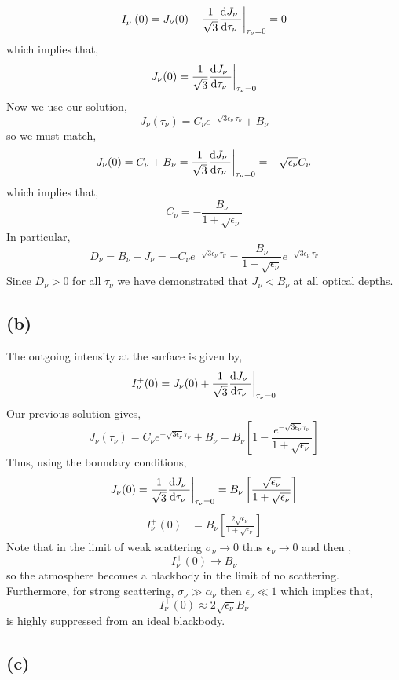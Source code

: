 \documentclass[12pt]{article}
\begin{document}
\[ I^{-}_\nu(0) = J_\nu(0) - \frac{1}{\sqrt{3}} \frac{\mathrm{d} J_\nu \;}{\mathrm{d} \tau_\nu \;} \bigg|_{\tau_\nu = 0} = 0 \]
which implies that,
\[ J_\nu(0) = \frac{1}{\sqrt{3}} \frac{\mathrm{d} J_\nu \;}{\mathrm{d} \tau_\nu \;} \bigg|_{\tau_\nu = 0} \]
Now we use our solution,
\[ J_\nu(\tau_\nu) = C_\nu e^{-\sqrt{3 \epsilon_\nu} \tau_\nu} + B_\nu \]
so we must match,
\[ J_\nu(0) = C_\nu + B_\nu = \frac{1}{\sqrt{3}}  \frac{\mathrm{d} J_\nu \;}{\mathrm{d} \tau_\nu \;} \bigg|_{\tau_\nu = 0} = - \sqrt{\epsilon_\nu} C_\nu \]
which implies that,
\[ C_\nu = - \frac{B_\nu}{1 + \sqrt{\epsilon_\nu}} \]
In particular,
\[ D_\nu = B_\nu - J_\nu = - C_\nu e^{-\sqrt{3 \epsilon_\nu} \tau_\nu} = \frac{B_\nu}{1 + \sqrt{\epsilon_\nu}} e^{-\sqrt{3 \epsilon_\nu} \tau_\nu} \]
Since $D_\nu > 0$ for all $\tau_\nu$ we have demonstrated that $J_\nu < B_\nu$ at all optical depths.

\subsection*{(b)}

The outgoing intensity at the surface is given by,
\[ I^{+}_\nu(0) = J_\nu(0) + \frac{1}{\sqrt{3}} \frac{\mathrm{d} J_\nu \;}{\mathrm{d} \tau_\nu \;} \bigg|_{\tau_\nu = 0} \]
Our previous solution gives,
\[ J_\nu(\tau_\nu) = C_\nu e^{-\sqrt{3 \epsilon_\nu} \tau_\nu} + B_\nu = B_\nu \left[ 1 - \frac{e^{-\sqrt{3 \epsilon_\nu} \tau_\nu}}{1 + \sqrt{\epsilon_\nu}} \right]  \]
Thus, using the boundary conditions,
\[ J_\nu(0)= \frac{1}{\sqrt{3}} \frac{\mathrm{d} J_\nu \;}{\mathrm{d} \tau_\nu \;} \bigg|_{\tau_\nu = 0} = B_\nu \left[ \frac{\sqrt{\epsilon_\nu}}{1 + \sqrt{\epsilon_\nu}} \right] \]
\begin{align*}
I^{+}_\nu(0) & = B_\nu \left[ \frac{2 \sqrt{\epsilon_\nu}}{1 + \sqrt{\epsilon_\nu}} \right]
\end{align*}
Note that in the limit of weak scattering $\sigma_\nu \to 0$ thus $\epsilon_\nu \to 0$ and then ,
\[ I^+_\nu(0) \to B_\nu \]
so the atmosphere becomes a blackbody in the limit of no scattering. Furthermore, for strong scattering, $\sigma_\nu \gg \alpha_\nu$ then $\epsilon_\nu \ll 1$ which implies that,
\[ I^{+}_\nu(0) \approx 2 \sqrt{\epsilon_\nu} B_\nu \]
is highly suppressed from an ideal blackbody. 

\subsection*{(c)}
\end{document}

